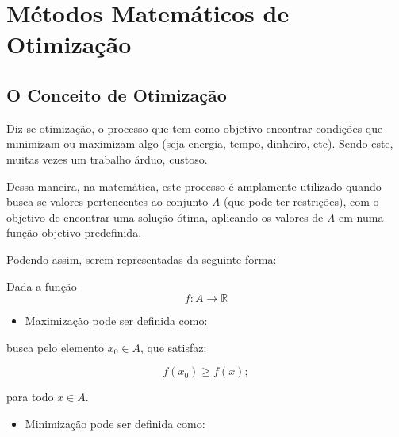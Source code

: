 

\chapter{\Large{Métodos Matemáticos de Otimização}}\label{chp:1}


\section{{O Conceito de Otimização}}

\hspace{0.8cm}
Diz-se otimização, o processo que tem como objetivo encontrar condições que
minimizam ou maximizam algo (seja energia, tempo, dinheiro, etc). Sendo este,
muitas vezes um trabalho árduo, custoso.

Dessa maneira, na matemática, este processo é amplamente utilizado quando
busca-se valores pertencentes ao conjunto \textit{A} (que pode ter
restrições), com o objetivo de encontrar uma solução ótima, aplicando os valores
de \textit{A} em numa função objetivo predefinida.

Podendo assim, serem representadas da seguinte forma:

    Dada a função
        \begin{equation}
            f : A \rightarrow \mathbb{R}
        \end{equation}

        \begin{itemize}
                \item Maximização pode ser definida como:
        \end{itemize}

                busca pelo elemento \(x_0 \in A\), que satisfaz:

                    \begin{equation}
                        f(x_0) \geq f(x);
                    \end{equation}

                para todo \(x \in A\).

        \begin{itemize}
                \item Minimização pode ser definida como:
        \end{itemize}

